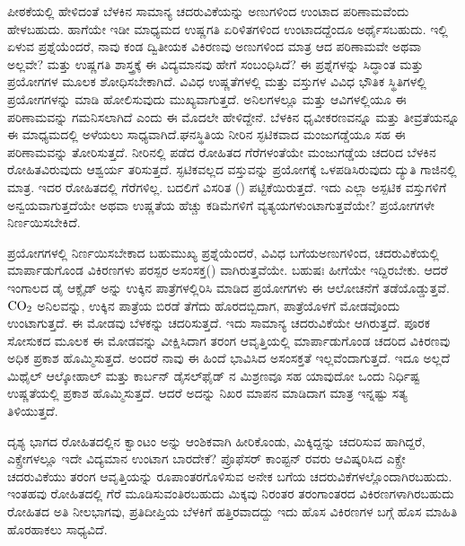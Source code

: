ಪೀಠಕೆಯಲ್ಲಿ ಹೇಳಿದಂತೆ ಬೆಳಕಿನ ಸಾಮಾನ್ಯ ಚದರುವಿಕೆಯನ್ನು ಅಣುಗಳಿಂದ ಉಂಟಾದ ಪರಿಣಾಮವೆಂದು ಹೇಳಬಹುದು. ಹಾಗೆಯೇ ಇಡೀ ಮಾಧ್ಯಮದ ಉಷ್ಣಗತಿ ಏರಿಳಿತಗಳಿಂದ ಉಂಟಾದದ್ದೆಂದೂ ಅರ್ಥೈಸಬಹುದು. ಇಲ್ಲಿ ಏಳುವ ಪ್ರಶ್ನೆಯೆಂದರೆ, ನಾವು ಕಂಡ ದ್ವಿತೀಯಕ ವಿಕಿರಣವು ಅಣುಗಳಿಂದ ಮಾತ್ರ ಆದ ಪರಿಣಾಮವೇ ಅಥವಾ ಅಲ್ಲವೇ? ಮತ್ತು ಉಷ್ಣಗತಿ ಶಾಸ್ತ್ರಕ್ಕೆ ಈ ವಿದ್ಯಮಾನವು ಹೇಗೆ ಸಂಬಂಧಿಸಿದೆ? ಈ ಪ್ರಶ್ನೆಗಳನ್ನು ಸಿದ್ಧಾಂತ ಮತ್ತು ಪ್ರಯೋಗಗಳ ಮೂಲಕ ಶೋಧಿಸಬೇಕಾಗಿದೆ. ವಿವಿಧ ಉಷ್ಣತೆಗಳಲ್ಲಿ ಮತ್ತು ವಸ್ತುಗಳ ವಿವಿಧ ಭೌತಿಕ ಸ್ಥಿತಿಗಳಲ್ಲಿ ಪ್ರಯೋಗಗಳನ್ನು ಮಾಡಿ ಹೋಲಿಸುವುದು ಮುಖ್ಯವಾಗುತ್ತದೆ. ಅನಿಲಗಳಲ್ಲೂ ಮತ್ತು ಆವಿಗಳ\-ಲ್ಲಿಯೂ ಈ ಪರಿಣಾಮವನ್ನು ಗಮನಿಸಲಾಗಿದೆ ಎಂದು ಈ ಮೊದಲೇ ಹೇಳಿದ್ದೇನೆ. ಬೆಳಕಿನ ಧೃವೀಕರಣವನ್ನೂ ಮತ್ತು ತೀವ್ರತೆಯನ್ನೂ ಈ ಮಾಧ್ಯಮದಲ್ಲಿ ಅಳೆಯಲು ಸಾಧ್ಯವಾಗಿದೆ.\break ಘನಸ್ಥಿತಿಯ ನೀರಿನ ಸ್ಫಟಿಕವಾದ ಮಂಜುಗಡ್ಡೆಯೂ ಸಹ ಈ ಪರಿಣಾಮವನ್ನು ತೋರಿಸುತ್ತದೆ. ನೀರಿನಲ್ಲಿ ಪಡೆದ ರೋಹಿತದ ಗೆರೆಗಳಂತೆಯೇ ಮಂಜುಗಡ್ಡೆಯ ಚದರಿದ ಬೆಳಕಿನ ರೋಹಿತವಿರುವುದು ಆಶ್ವರ್ಯ ತರಿಸುತ್ತದೆ. ಸ್ಫಟಿಕವಲ್ಲದ ವಸ್ತುವನ್ನು ಪ್ರಯೋಗಕ್ಕೆ ಒಳಪಡಿಸಿರುವುದು ದ್ಯುತಿ ಗಾಜಿನಲ್ಲಿ ಮಾತ್ರ. ಇದರ ರೋಹಿತದಲ್ಲಿ ಗೆರೆಗಳಿಲ್ಲ. ಬದಲಿಗೆ ವಿಸರಿತ () ಪಟ್ಟಿಕೆಯಿರುತ್ತದೆ. ಇದು ಎಲ್ಲಾ ಅಸ್ಪಟಿಕ ವಸ್ತುಗಳಿಗೆ ಅನ್ವಯವಾಗುತ್ತದೆಯೇ ಅಥವಾ ಉಷ್ಣತೆಯ ಹೆಚ್ಚು ಕಡಿಮೆಗಳಿಗೆ ವ್ಯತ್ಯಯಗಳುಂಟಾಗುತ್ತವೆಯೇ? ಪ್ರಯೋಗಗಳೇ ನಿರ್ಣಯಿಸಬೇಕಿದೆ.



ಪ್ರಯೋಗಗಳಲ್ಲಿ ನಿರ್ಣಯಿಸಬೇಕಾದ ಬಹುಮುಖ್ಯ ಪ್ರಶ್ನೆಯೆಂದರೆ, ವಿವಿಧ ಬಗೆಯ\break ಅಣುಗಳಿಂದ, ಚದರುವಿಕೆಯಲ್ಲಿ ಮಾರ್ಪಾಡುಗೊಂಡ ವಿಕಿರಣಗಳು ಪರಸ್ಪರ ಅಸಂಸಕ್ತ\break () ವಾಗಿರುತ್ತವೆಯೇ. ಬಹುಷಃ ಹೀಗೆಯೇ ಇದ್ದಿರಬೇಕು. ಆದರೆ ಇಂಗಾಲದ ಡೈ ಆಕ್ಸೈಡ್ ಅನ್ನು ಉಕ್ಕಿನ ಪಾತ್ರೆಗಳಲ್ಲಿರಿಸಿ ಮಾಡಿದ ಪ್ರಯೋಗಗಳು ಈ ಆಲೋಚನೆಗೆ ತಡೆಯೊಡ್ಡುತ್ತವೆ. ${\rm CO}_2$ ಅನಿಲವನ್ನು, ಉಕ್ಕಿನ ಪಾತ್ರೆಯ ಬಿರಡೆ ತೆಗೆದು ಹೊರದಬ್ಬಿದಾಗ, ಪಾತ್ರೆಯೊಳಗೆ ಮೋಡ\-ವೊಂದು ಉಂಟಾಗುತ್ತದೆ. ಈ ಮೋಡವು ಬೆಳಕನ್ನು ಚದರಿಸುತ್ತದೆ. ಇದು ಸಾಮಾನ್ಯ ಚದರುವಿಕೆಯೇ ಆಗಿರುತ್ತದೆ. ಪೂರಕ ಸೋಸುಕದ ಮೂಲಕ ಈ ಮೋಡವನ್ನು ವೀಕ್ಷಿಸಿದಾಗ ತರಂಗ ಆವೃತ್ತಿಯಲ್ಲಿ ಮಾರ್ಪಾಡುಗೊಂಡ ಚದರಿದ ವಿಕಿರಣವು ಅಧಿಕ ಪ್ರಕಾಶ ಹೊಮ್ಮಿಸುತ್ತದೆ. ಅಂದರೆ ನಾವು ಈ ಹಿಂದೆ ಭಾವಿಸಿದ ಅಸಂಸಕ್ತತೆ ಇಲ್ಲವೆಂದಾಗುತ್ತದೆ. ಇದೂ ಅಲ್ಲದೆ ಮಿಥೈಲ್ ಆಲ್ಕೋಹಾಲ್ ಮತ್ತು ಕಾರ್ಬನ್ ಡೈಸಲ್‍ಫೈಡ್ ನ ಮಿಶ್ರಣವೂ ಸಹ ಯಾವುದೋ ಒಂದು ನಿರ್ಧಿಷ್ಟ ಉಷ್ಣತೆಯಲ್ಲಿ ಪ್ರಕಾಶ ಹೊಮ್ಮಿಸುತ್ತದೆ. ಆದರೆ ಅದನ್ನು ನಿಖರ ಮಾಪನ ಮಾಡಿದಾಗ ಮಾತ್ರ ಇನ್ನಷ್ಟು ಸತ್ಯ ತಿಳಿಯುತ್ತದೆ.



ದೃಶ್ಯ ಭಾಗದ ರೋಹಿತದಲ್ಲಿನ ಕ್ವಾಂಟಂ ಅನ್ನು ಆಂಶಿಕವಾಗಿ ಹೀರಿಕೊಂಡು, ಮಿಕ್ಕಿದ್ದನ್ನು ಚದರಿಸುವ ಹಾಗಿದ್ದರೆ, ಎಕ್ಸ್\enginline{-}ರೇಗಳಲ್ಲೂ ಇದೇ ವಿದ್ಯಮಾನ ಉಂಟಾಗ ಬಾರದೇಕೆ? ಪ್ರೊಫೆಸರ್ ಕಾಂಪ್ಟನ್ ರವರು ಆವಿಷ್ಕರಿಸಿದ ಎಕ್ಸ್\enginline{-}ರೇ ಚದರುವಿಕೆಯು ತರಂಗ ಆವೃತ್ತಿಯನ್ನು ರೂಪಾಂತರ\-ಗೊಳಿಸುವ ಅನೇಕ ಬಗೆಯ ಚದರುವಿಕೆಗಳಲ್ಲೊಂದಾಗಿರಬಹುದು. ಇಂತಹವು ರೋಹಿತದಲ್ಲಿ ಗೆರೆ ಮೂಡಿಸುವಂತಿರಬಹುದು ಮಿಕ್ಕವು ನಿರಂತರ ತರಂಗಾಂತರದ ವಿಕಿರಣಗಳಾಗಿರಬಹುದು ರೋಹಿತದ ಅತಿ ನೀಲಭಾಗವು, ಪ್ರತಿದೀಪ್ತಿಯ ಬೆಳಕಿಗೆ ಹತ್ತಿರವಾದದ್ದು ಇದು ಹೊಸ ವಿಕಿರಣಗಳ ಬಗ್ಗೆ ಹೊಸ ಮಾಹಿತಿ ಹೊರಹಾಕಲು ಸಾಧ್ಯವಿದೆ.


